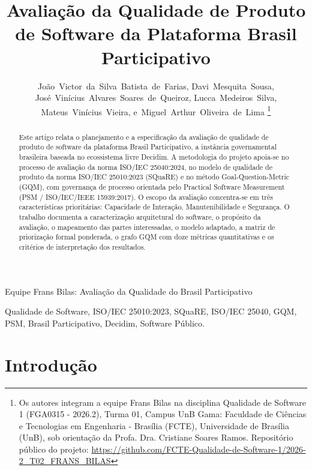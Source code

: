 \documentclass[journal]{IEEEtran}
\begin{document}
\title{Avaliação da Qualidade de Produto de Software da Plataforma Brasil Participativo}

\author{João~Victor~da~Silva~Batista~de~Farias,
        Davi~Mesquita~Sousa,
        José~Vinícius~Alvares~Soares~de~Queiroz,
        Lucca~Medeiros~Silva,
        Mateus~Vinícius~Vieira,
        e~Miguel~Arthur~Oliveira~de~Lima%
\thanks{Os autores integram a equipe Frans Bilas na disciplina Qualidade de Software 1 (FGA0315 - 2026.2), Turma 01, Campus UnB Gama: Faculdade de Ciências e Tecnologias em Engenharia - Brasília (FCTE), Universidade de Brasília (UnB), sob orientação da Profa. Dra. Cristiane Soares Ramos. Repositório público do projeto: \url{https://github.com/FCTE-Qualidade-de-Software-1/2026-2_T02_FRANS_BILAS}}%
}

%
{Equipe Frans Bilas: Avaliação da Qualidade do Brasil Participativo}

\maketitle

\begin{abstract}
Este artigo relata o planejamento e a especificação da avaliação de qualidade de produto de software da plataforma Brasil Participativo, a instância governamental brasileira baseada no ecossistema livre Decidim. A metodologia do projeto apoia-se no processo de avaliação da norma ISO/IEC 25040:2024, no modelo de qualidade de produto da norma ISO/IEC 25010:2023 (SQuaRE) e no método Goal-Question-Metric (GQM), com governança de processo orientada pelo Practical Software Measurement (PSM / ISO/IEC/IEEE 15939:2017). O escopo da avaliação concentra-se em três características prioritárias: Capacidade de Interação, Manutenibilidade e Segurança. O trabalho documenta a caracterização arquitetural do software, o propósito da avaliação, o mapeamento das partes interessadas, o modelo adaptado, a matriz de priorização formal ponderada, o grafo GQM com doze métricas quantitativas e os critérios de interpretação dos resultados.
\end{abstract}

\begin{IEEEkeywords}
Qualidade de Software, ISO/IEC 25010:2023, SQuaRE, ISO/IEC 25040, GQM, PSM, Brasil Participativo, Decidim, Software Público.
\end{IEEEkeywords}

\section{Introdução}
\label{sec:introducao}
\end{document}
